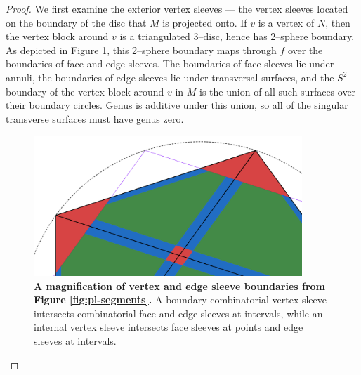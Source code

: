 \begin{proof}
	We first examine the exterior vertex sleeves ---  the vertex sleeves located on the boundary of the disc that $M$ is projected onto.
	If $v$ is a vertex of $N$, then the vertex block around $v$ is a triangulated 3--disc, hence has 2--sphere boundary.
	As depicted in Figure \ref{fig:pl-segments-zoom}, this 2--sphere boundary maps through $f$ over the boundaries of face and edge sleeves.
	The boundaries of face sleeves lie under annuli, the boundaries of edge sleeves lie under transversal surfaces, and the $S^2$ boundary of the vertex block around $v$ in $M$ is the union of all such surfaces over their boundary circles.
	Genus is additive under this union, so all of the singular transverse surfaces must have genus zero.
	
	\begin{figure}[h!]
		\centering
		\includegraphics[width=0.9\textwidth]{figures/pl-segments-zoom.png}
		\caption{
			\textbf{A magnification of vertex and edge sleeve boundaries from Figure \ref{fig:pl-segments}.}
			A boundary combinatorial vertex sleeve intersects combinatorial face and edge sleeves at intervals, while an internal vertex sleeve intersects face sleeves at points and edge sleeves at intervals.
		}
		\label{fig:pl-segments-zoom}
	\end{figure}
	

\end{proof}
